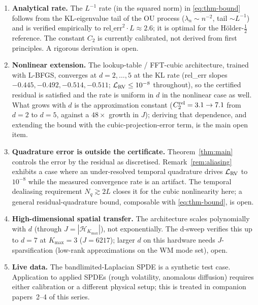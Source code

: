 \begin{enumerate}
\item \textbf{Analytical rate.} The $L^{-1}$ rate (in the squared
norm) in \eqref{eq:thm-bound} follows from the KL-eigenvalue tail of
the OU process ($\lambda_n \sim n^{-2}$, tail $\sim L^{-1}$) and is
verified empirically to $\mathrm{rel\_err}^2 \cdot L \approx 2.6$;
it is optimal for the H\"older-$\tfrac12$ reference. The constant
$C_2$ is currently calibrated, not derived from first principles. A
rigorous derivation is open.
\item \textbf{Nonlinear extension.} The lookup-table / FFT-cubic
architecture, trained with L-BFGS, converges at $d = 2, \dots, 5$ at the
KL rate (rel\_err slopes $-0.445, -0.492, -0.514, -0.511$;
$\mathcal{L}_{\rm RV} \le 10^{-8}$ throughout), so the certified residual
is satisfied and the rate is uniform in $d$ in the nonlinear case as
well. What grows with $d$ is the approximation constant
($C_2^{\rm rel} = 3.1 \to 7.1$ from $d = 2$ to $d = 5$, against a
$48\times$ growth in $J$); deriving that dependence, and extending the
bound with the cubic-projection-error term, is the main open item.
\item \textbf{Quadrature error is outside the certificate.}
Theorem~\ref{thm:main} controls the error by the residual as
discretised. Remark~\ref{rem:aliasing} exhibits a case where an
under-resolved temporal quadrature drives $\mathcal{L}_{\rm RV}$ to
$10^{-8}$ while the measured convergence rate is an artifact. The
temporal dealiasing requirement $N_q \gtrsim 2L$ closes it for the cubic
nonlinearity here; a general residual-quadrature bound, composable with
\eqref{eq:thm-bound}, is open.
\item \textbf{High-dimensional spatial transfer.} The architecture
scales polynomially with $d$ (through $J = |\mathcal{H}_{K_{\max}}|$),
not exponentially. The d-sweep verifies this up to $d = 7$ at
$K_{\max} = 3$ ($J = 6217$); larger $d$ on this hardware needs
$J$-sparsification (low-rank approximations on the WM mode set), open.
\item \textbf{Live data.} The bandlimited-Laplacian SPDE is a synthetic
test case. Application to applied SPDEs (rough volatility, anomalous
diffusion) requires either calibration or a different physical
setup; this is treated in companion papers~2--4 of this series.
\end{enumerate}
